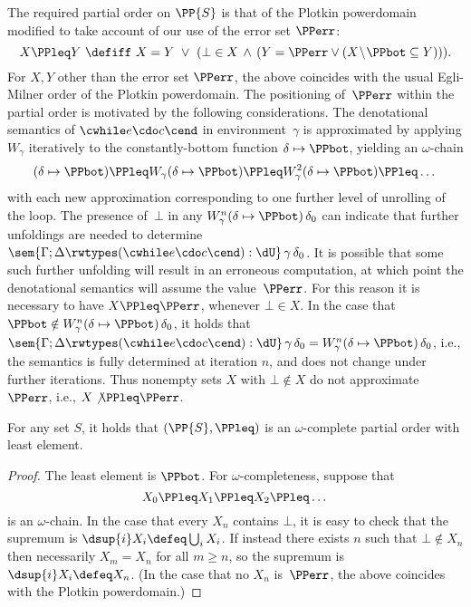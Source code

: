 The required partial order on $\PP{S}$ is that of the Plotkin powerdomain~\cite{plotkin1976powerdomain} modified to take account of our use of the error set $\PPerr$:
%
\begin{equation*}
  X \PPleq Y ~ \defiff~
  X = Y  ~\lor ~
  (\bot \in X \, \land\, (Y = \PPerr \lor (X \!\setminus\! \PPbot \subseteq Y))).
\end{equation*}
%
For $X, Y$ other than the error set $\PPerr$, the above coincides with the usual Egli-Milner order of the Plotkin powerdomain.
The positioning of~$\PPerr$ within the partial order is motivated by the following considerations.
%
The denotational semantics of $\cwhile e \cdo c \cend$ in environment~$\gamma$ is approximated by
applying $W_\gamma$ iteratively to the constantly-bottom function  $\delta \mapsto \PPbot$, yielding an $\omega$-chain
%
\begin{equation*}
  (\delta \mapsto \PPbot) \PPleq W_\gamma(\delta \mapsto \PPbot) \PPleq W_\gamma^2(\delta \mapsto \PPbot) \PPleq \dots
\end{equation*}
%
with each new approximation corresponding to one further level of unrolling of the loop. 
The presence of~$\bot$ in any $W_\gamma^n(\delta \mapsto \PPbot)\,\delta_0$ can indicate that
further unfoldings are needed to determine
$\sem{\Gamma ; \Delta \rwtypes (\cwhile e \cdo c \cend) : \dU} \, \gamma \, \delta_0$.
It is possible that some such further unfolding will result in an erroneous computation, at which point the denotational semantics will assume the value~$\PPerr$. For this reason it is necessary to have $X \PPleq \PPerr$, whenever $\bot \in X$.
In the case that $\PPbot \notin W_\gamma^n(\delta \mapsto \PPbot)\,\delta_0$, it holds that 
$\sem{\Gamma ; \Delta \rwtypes (\cwhile e \cdo c \cend) : \dU} \, \gamma \, \delta_0 = 
W_\gamma^n(\delta \mapsto \PPbot)\,\delta_0$, i.e., the semantics is fully determined at iteration $n$, and does not change under further iterations.
Thus nonempty sets $X$ with $\bot \notin X$ do not approximate $\PPerr$, i.e., $X \not\PPleq \PPerr$.

\begin{proposition} 
\label{prop:domain}
For any set $S$, it holds that $(\PP{S}, \PPleq)$ is an $\omega$-complete partial order with least element.
\end{proposition}

\begin{proof}
The least element is $\PPbot$.
%
For $\omega$-completeness, suppose that
%
\begin{equation*}
  X_0 \PPleq X_1 \PPleq X_2 \PPleq \dots
\end{equation*}
%
is an $\omega$-chain.
In the case that every $X_n$ contains $\bot$, it is easy to check that the supremum is $ \dsup{i} X_i \defeq \bigcup_i X_i$.
If instead there exists $n$ such that $\bot \notin X_n$ then necessarily $X_m = X_n$ for all $m \geq n$, so 
the supremum is $\dsup{i} X_i \defeq X_n$. (In the case that no $X_n$ is~$\PPerr$, the above coincides with the Plotkin powerdomain.)
\end{proof}

